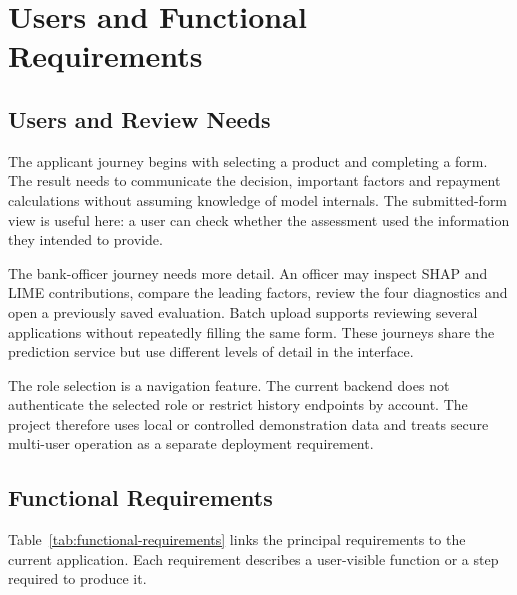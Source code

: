 \section{Users and Functional Requirements}
\subsection{Users and Review Needs}
The applicant journey begins with selecting a product and completing a form. The result needs to communicate the decision, important factors and repayment calculations without assuming knowledge of model internals. The submitted-form view is useful here: a user can check whether the assessment used the information they intended to provide.

The bank-officer journey needs more detail. An officer may inspect SHAP and LIME contributions, compare the leading factors, review the four diagnostics and open a previously saved evaluation. Batch upload supports reviewing several applications without repeatedly filling the same form. These journeys share the prediction service but use different levels of detail in the interface.

The role selection is a navigation feature. The current backend does not authenticate the selected role or restrict history endpoints by account. The project therefore uses local or controlled demonstration data and treats secure multi-user operation as a separate deployment requirement.

\subsection{Functional Requirements}
Table~\ref{tab:functional-requirements} links the principal requirements to the current application. Each requirement describes a user-visible function or a step required to produce it.

